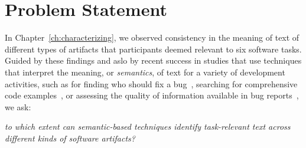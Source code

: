 
\section{Problem Statement}
\label{cp5:motivation}









In Chapter~\ref{ch:characterizing},
we observed consistency in the meaning of text of 
different types of artifacts that  
participants deemed relevant to six software tasks.
Guided by these findings and aslo by recent success 
in studies that use techniques that interpret the meaning, or \textit{semantics}, of text
for a variety of development activities, such as
for finding who should fix a bug~\cite{yang2016}, searching for comprehensive code examples~\cite{silva2019}, 
or assessing the quality of information available in bug reports~\cite{chaparro2019}, we ask:



\medskip
\begin{bluequote}
    \textit{to which extent can semantic-based techniques identify task-relevant text across different kinds of software artifacts?}
\end{bluequote}




